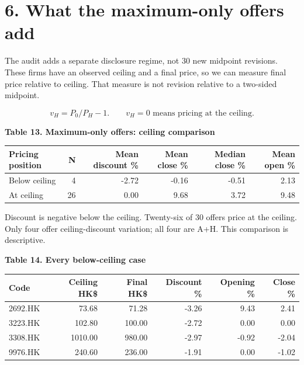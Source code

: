 \documentclass[10pt,a4paper]{article}
\begin{document}
\clearpage

\section*{6. What the maximum-only offers add}

The audit adds a separate disclosure regime, not 30 new midpoint revisions. These firms have an observed ceiling and a final price, so we can measure final price relative to ceiling. That measure is not revision relative to a two-sided midpoint.

\[
v_H=P_0/P_H-1.\qquad v_H=0\text{ means pricing at the ceiling.}
\]

\par\addvspace{5pt}\textbf{Table 13. Maximum-only offers: ceiling comparison}\par\nobreak\vspace{2pt}

{\small\renewcommand{\arraystretch}{1.10}\begin{tabularx}{\textwidth}{@{}Xrrrrr@{}}\toprule

\textbf{Pricing position} & \textbf{N} & \textbf{Mean discount \%} & \textbf{Mean close \%} & \textbf{Median close \%} & \textbf{Mean open \%} \\\midrule

Below ceiling & 4 & -2.72 & -0.16 & -0.51 & 2.13 \\

At ceiling & 26 & 0.00 & 9.68 & 3.72 & 9.48 \\

\bottomrule\end{tabularx}}\par

{\footnotesize Discount is negative below the ceiling. Twenty-six of 30 offers price at the ceiling. Only four offer ceiling-discount variation; all four are A+H. This comparison is descriptive.}\par

\par\addvspace{5pt}\textbf{Table 14. Every below-ceiling case}\par\nobreak\vspace{2pt}

{\small\renewcommand{\arraystretch}{1.10}\begin{tabularx}{\textwidth}{@{}Xrrrrr@{}}\toprule

\textbf{Code} & \textbf{Ceiling HK\$} & \textbf{Final HK\$} & \textbf{Discount \%} & \textbf{Opening \%} & \textbf{Close \%} \\\midrule

2692.HK & 73.68 & 71.28 & -3.26 & 9.43 & 2.41 \\

3223.HK & 102.80 & 100.00 & -2.72 & 0.00 & 0.00 \\

3308.HK & 1010.00 & 980.00 & -2.97 & -0.92 & -2.04 \\

9976.HK & 240.60 & 236.00 & -1.91 & 0.00 & -1.02 \\

\bottomrule\end{tabularx}}\par
\end{document}
